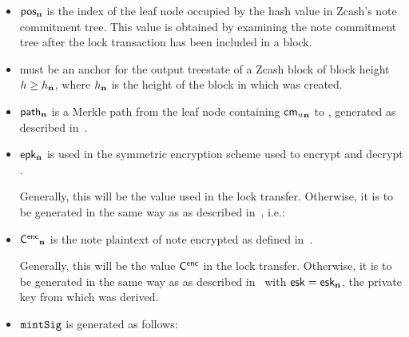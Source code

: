 \begin{itemize}
    \item $\mathsf{pos_{\mathbf{n}}}$ is the index of the leaf node occupied by the hash value \cmun in Zcash's note commitment tree.
    This value is obtained by examining the note commitment tree after the lock transaction has been included in a block.
    
    \item \rtn must be an anchor for the output treestate of a Zcash block of block height $h \geq h_\mathbf{n}$, where $h_\mathbf{n}$ is the height of the block in which \n was created.
    
    \item $\mathsf{path_{\mathbf{n}}}$ is a Merkle path from the leaf node containing $\mathsf{{cm_{\mathnormal{u}}}_{\mathbf{n}}}$ to \rtn, generated as described in~\cite[Section 4.8]{hopwood2016zcash}.
    
    \item $\mathsf{epk_{\mathbf{n}}}$ is used in the symmetric encryption scheme used to encrypt and decrypt \cencn.
    
    Generally, this will be the value \epk used in the lock transfer.
    Otherwise, it is to be generated in the same way as \epk as described in~\cite[Sections 4.6.2 and 4.17.1]{hopwood2016zcash}, i.e.:

    \item $\mathsf{{C^{enc}}_{\mathbf{n}}}$ is the note plaintext of note \n encrypted as defined in~\cite[Section 4.17.1]{hopwood2016zcash}.
    
    Generally, this will be the value $\mathsf{C^{enc}}$ in the lock transfer.
    Otherwise, it is to be generated in the same way as \cenc as described in~\cite[Section 4.17.1]{hopwood2016zcash} with $\mathsf{esk} = \mathsf{esk_{\mathbf{n}}}$, the private key from which \epkn was derived.
    
    \item $\mathtt{mintSig}$ is generated as follows:
    

\end{itemize}
